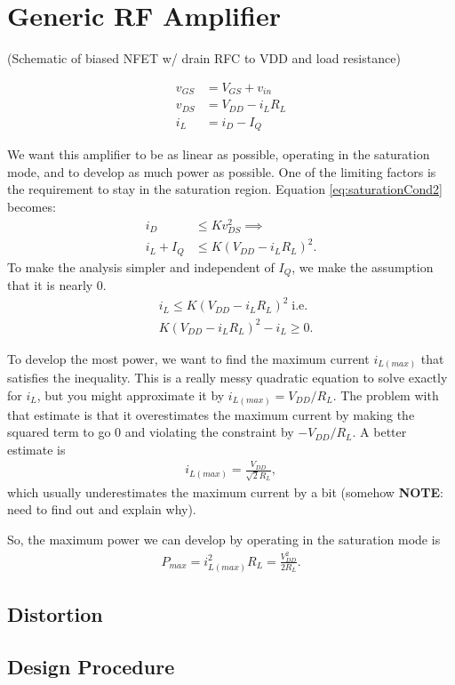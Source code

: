 \documentclass[letterpaper,10pt]{report}
\begin{document}
\chapter{Generic RF Amplifier}%

\noindent (Schematic of biased NFET w/ drain RFC to VDD and load resistance)

\begin{align}
 v_{GS} &= V_{GS} + v_{in} \\
 v_{DS} &= V_{DD} - i_LR_L \\
 i_L &= i_D-I_Q
\end{align}

We want this amplifier to be as linear as possible, operating in the saturation
mode, and to develop as much power as possible. One of the limiting factors
is the requirement to stay in the saturation region. Equation
\eqref{eq:saturationCond2} becomes:
\begin{align}
 i_D &\leq Kv_{DS}^2 \implies \nonumber \\
 i_L + I_Q &\leq K(V_{DD}-i_LR_L)^2. \nonumber
\end{align}
To make the analysis simpler and independent of $I_Q$, we make the assumption
that it is nearly 0.
\begin{align}
 &i_L \leq K(V_{DD}-i_LR_L)^2 \; \text{i.e.} \nonumber \\
 &K(V_{DD}-i_LR_L)^2 - i_L \geq 0.
\end{align}

To develop the most power, we want to find the maximum current $i_{L(max)}$ that
satisfies the inequality. This is a really messy quadratic equation to solve
exactly for $i_L$, but you might approximate it by $i_{L(max)}=V_{DD}/R_L$. The
problem with that estimate is that it overestimates the maximum current by
making the squared term to go 0 and violating the constraint by $-V_{DD}/R_L$.
A better estimate is
\begin{align}
 i_{L(max)} = \frac{V_{DD}}{\sqrt{2}R_L},
\end{align}
which usually underestimates the maximum current by a bit (somehow
\textbf{NOTE}: need to find out and explain why).

So, the maximum power we can develop by operating in the saturation mode is
\begin{align}
 P_{max} = i_{L(max)}^2R_L = \frac{V_{DD}^2}{2R_L}.
\end{align}


\section{Distortion}

\section{Design Procedure}
\end{document}
